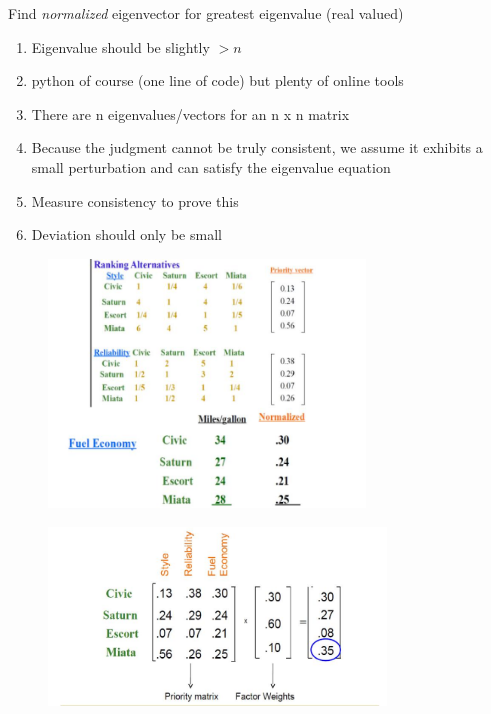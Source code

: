 \documentclass[aspectratio=1610,pdftex,dvipsnames,compress,xcolor={dvipsnames}]{beamer}
\begin{document}
\begin{frame}{Find \textit{normalized} eigenvector for greatest eigenvalue (real valued)}
    \begin{enumerate}[series=outerlist,topsep=0pt,itemsep=21pt,leftmargin=*,label=(\arabic*)]
        \item[]Eigenvalue should be slightly $> n$
        \item[]python of course (one line of code) but plenty of online tools 
        \item[]There are n eigenvalues/vectors for an n x n matrix
        \item[]Because the judgment cannot be truly consistent, we assume it exhibits a small perturbation and can satisfy the eigenvalue equation
        \item[]Measure consistency to prove this
        \item[]Deviation should only be small
    \end{enumerate}
\end{frame}


\begin{frame}{}
    \begin{figure}
        \centering
        \includegraphics[width=0.75\textwidth]{ahp_car.rank.jpg}
    \end{figure}
\end{frame}


\begin{frame}{}
    \begin{figure}
        \centering
        \includegraphics[width=0.80\textwidth]{ahp_car.priority.jpg}
    \end{figure}
\end{frame}
\end{document}
